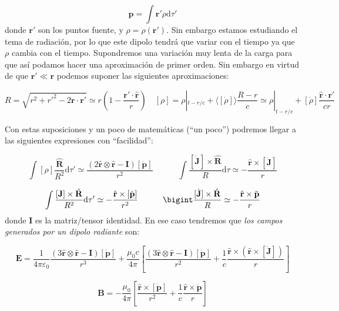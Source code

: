 \documentclass[12pt,a4paper]{article}
\newcommand{\parentesis}[1]{\left( #1  \right)}
\newcommand{\ccorchetes}[1]{\left[ #1  \right]}
\newcommand{\D}{\mathrm{d}}
\newcommand{\tquad}{\quad \quad \quad}
\newcommand{\Bn}{\mathbf{B}}
\newcommand{\En}{\mathbf{E}}
\newcommand{\Jn}{\mathbf{J}}
\newcommand{\rn}{\mathbf{r}}
\newcommand{\pn}{\mathbf{p}}
\newcommand{\In}{\mathbf{I}}
\newcommand{\hnr}{\hat{\mathbf{r}}}
\newcommand{\hnR}{\hat{\mathbf{R}}}
\numberwithin{equation}{section}
\numberwithin{figure}{section}
\begin{document}
\begin{equation}
\pn = \int \rn' \rho \D \tau '
\end{equation}
donde $\rn'$ son los puntos fuente, y $\rho = \rho (\rn')$. Sin embargo estamos estudiando el tema de radiación, por lo que este dipolo tendrá que variar con el tiempo ya que $\rho$ cambia con el tiempo. Supondremos una variación muy lenta de la carga para que así podamos hacer una aproximación de primer orden. Sin embargo en virtud de que $\rn' \ll \rn$ podemos suponer las siguientes aproximaciones:

\begin{equation}
R = \sqrt{r^2 + r'^2 - 2 \rn \cdot \rn'} \simeq r\parentesis{1-\dfrac{\rn' \cdot \hnr}{r}} \quad [\rho] = \rho |_{t-r/c} + \langle [ \dot{\rho} ] \rangle \frac{R-r}{c} \simeq \rho |_{t-r/c} + [\dot{\rho}] \dfrac{\hnr \cdot  \rn'}{c r}
\end{equation}

Con estas suposiciones y un poco de matemáticas (``un poco'') podremos llegar a las siguientes expresiones con ``facilidad'':

\begin{equation}
\int [\rho] \dfrac{\hnR}{R^2} \D \tau' \simeq \dfrac{(2 \hnr \otimes \hnr - \In) [\dot{\pn}]}{r^2 } \tquad \int \dfrac{[\dot{\Jn}] \times \hnR}{R} \D \tau \simeq - \dfrac{\hnr \times [\ddot{\Jn}]}{r}
\end{equation}

\begin{equation}
\int  \dfrac{[\Jn]\times \hnR}{R^2} \D  \tau' \simeq - \dfrac{\hnr \times [\dot{\pn}]}{r^2} \tquad 
\bigint \dfrac{[\dot{\Jn}]\times \hnR}{R} \simeq - \dfrac{\hnr \times \ddot{\pn}}{r}
\end{equation}
donde $\In$ es la matriz/tensor identidad. En ese caso tendremos que \textit{los campos generados por un dipolo radiante} son:

\begin{equation}
\En = \dfrac{1}{4 \pi \varepsilon_0 } \dfrac{(3 \hnr \otimes \hnr - \In) [\dot{\pn}]}{r^3 } + \dfrac{\mu_0 c}{4 \pi} \ccorchetes{\dfrac{(3 \hnr \otimes \hnr - \In) [\dot{\pn}]}{r^2 }+ \dfrac{1}{c}\dfrac{\hnr \times (\hnr \times [\ddot{\Jn}])}{r}}
\end{equation}

\begin{equation}
\Bn = - \dfrac{\mu_0}{4 \pi} \ccorchetes{ \dfrac{\hnr \times [\dot{\pn}]}{r^2} + \dfrac{1}{c}\dfrac{\hnr \times \ddot{\pn}}{r}}
\end{equation}
\end{document}
